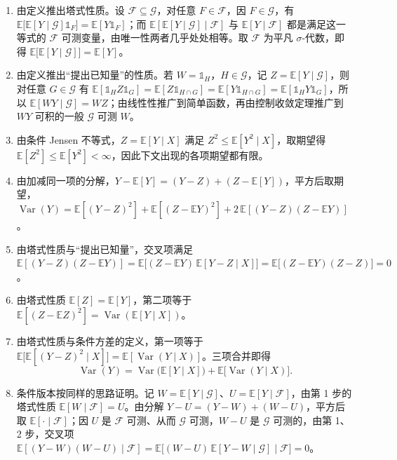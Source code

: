 \begin{enumerate}
\item 由定义推出塔式性质。设 $\mathcal F\subseteq\mathcal G$，对任意 $F\in\mathcal F$，因 $F\in\mathcal G$，有 $\mathbb{E}\big[\mathbb{E}[Y\mid\mathcal G]\mathbb 1_F\big]=\mathbb{E}[Y\mathbb 1_F]$；而 $\mathbb{E}[\mathbb{E}[Y\mid\mathcal G]\mid\mathcal F]$ 与 $\mathbb{E}[Y\mid\mathcal F]$ 都是满足这一等式的 $\mathcal F$ 可测变量，由唯一性两者几乎处处相等。取 $\mathcal F$ 为平凡 $\sigma$-代数，即得 $\mathbb{E}\big[\mathbb{E}[Y\mid\mathcal G]\big]=\mathbb{E}[Y]$。
\item 由定义推出“提出已知量”的性质。若 $W=\mathbb 1_H$，$H\in\mathcal G$，记 $Z=\mathbb{E}[Y\mid\mathcal G]$，则对任意 $G\in\mathcal G$ 有 $\mathbb{E}[\mathbb 1_HZ\mathbb 1_G]=\mathbb{E}[Z\mathbb 1_{H\cap G}]=\mathbb{E}[Y\mathbb 1_{H\cap G}]=\mathbb{E}[\mathbb 1_HY\mathbb 1_G]$，所以 $\mathbb{E}[WY\mid\mathcal G]=WZ$；由线性性推广到简单函数，再由控制收敛定理推广到 $WY$ 可积的一般 $\mathcal G$ 可测 $W$。
\item 由条件 Jensen 不等式，$Z=\mathbb{E}[Y\mid X]$ 满足 $Z^2\le\mathbb{E}[Y^2\mid X]$，取期望得 $\mathbb{E}[Z^2]\le\mathbb{E}[Y^2]<\infty$，因此下文出现的各项期望都有限。
\item 由加减同一项的分解，$Y-\mathbb{E}[Y]=(Y-Z)+(Z-\mathbb{E}[Y])$，平方后取期望，$\operatorname{Var}(Y)=\mathbb{E}[(Y-Z)^2]+\mathbb{E}[(Z-\mathbb{E}Y)^2]+2\,\mathbb{E}[(Y-Z)(Z-\mathbb{E}Y)]$。
\item 由塔式性质与“提出已知量”，交叉项满足 $\mathbb{E}[(Y-Z)(Z-\mathbb{E}Y)]=\mathbb{E}\big[(Z-\mathbb{E}Y)\,\mathbb{E}[Y-Z\mid X]\big]=\mathbb{E}\big[(Z-\mathbb{E}Y)(Z-Z)\big]=0$。
\item 由塔式性质 $\mathbb{E}[Z]=\mathbb{E}[Y]$，第二项等于 $\mathbb{E}[(Z-\mathbb{E}Z)^2]=\operatorname{Var}(\mathbb{E}[Y\mid X])$。
\item 由塔式性质与条件方差的定义，第一项等于 $\mathbb{E}\big[\mathbb{E}[(Y-Z)^2\mid X]\big]=\mathbb{E}[\operatorname{Var}(Y\mid X)]$。三项合并即得
\begin{equation}\label{eq:ap-totvar}
\operatorname{Var}(Y)=\operatorname{Var}\big(\mathbb{E}[Y\mid X]\big)+\mathbb{E}\big[\operatorname{Var}(Y\mid X)\big].
\end{equation}
\item 条件版本按同样的思路证明。记 $W=\mathbb{E}[Y\mid\mathcal G]$、$U=\mathbb{E}[Y\mid\mathcal F]$，由第 1 步的塔式性质 $\mathbb{E}[W\mid\mathcal F]=U$。由分解 $Y-U=(Y-W)+(W-U)$，平方后取 $\mathbb{E}[\cdot\mid\mathcal F]$；因 $U$ 是 $\mathcal F$ 可测、从而 $\mathcal G$ 可测，$W-U$ 是 $\mathcal G$ 可测的，由第 1、2 步，交叉项 $\mathbb{E}[(Y-W)(W-U)\mid\mathcal F]=\mathbb{E}\big[(W-U)\,\mathbb{E}[Y-W\mid\mathcal G]\mid\mathcal F\big]=0$。

\end{enumerate}
